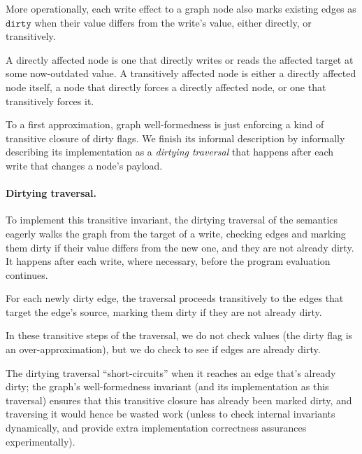 \documentclass[11pt]{article}
\renewcommand{\ottkw}[1]{\mathtt{#1}}
\begin{document}
More operationally, each write effect to a graph node also marks
existing edges as $\ottkw{dirty}$ when their value differs from the write's
value, either directly, or transitively.

A directly affected node is one that directly writes or reads the
affected target at some now-outdated value.
%
A transitively affected node is either a directly affected node
itself, a node that directly forces a directly affected node, or one
that transitively forces it.

To a first approximation, graph well-formedness is just enforcing a
kind of transitive closure of dirty flags.
%
We finish its informal description by informally describing its
implementation as a \emph{dirtying traversal} that happens after each
write that changes a node's payload.

\paragraph{Dirtying traversal.}
To implement this transitive invariant, the dirtying traversal of the
semantics eagerly walks the graph from the target of a write, checking
edges and marking them dirty if their value differs from the new one,
and they are not already dirty.
%
It happens after each write, where necessary, before the program
evaluation continues.

For each newly dirty edge, the traversal proceeds transitively to the
edges that target the edge's source, marking them dirty if they are
not already dirty.

In these transitive steps of the traversal, we do not check values
(the dirty flag is an over-approximation), but we do check to see if
edges are already dirty.

The dirtying traversal ``short-circuits'' when it reaches an edge
that's already dirty; the graph's well-formedness invariant (and its
implementation as this traversal) ensures that this transitive closure
has already been marked dirty, and traversing it would hence be wasted
work (unless to check internal invariants dynamically, and provide
extra implementation correctness assurances experimentally).
\end{document}
